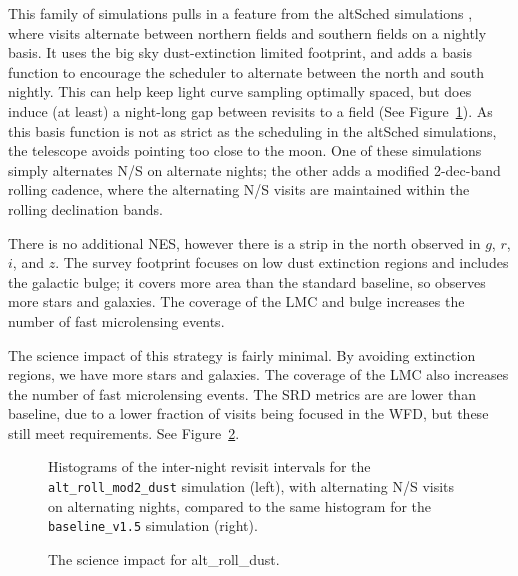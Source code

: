 This family of simulations pulls in a feature from the altSched simulations \citep{Rothchild19}, where visits alternate between northern fields and southern fields on a nightly basis. It uses the big sky dust-extinction limited footprint, and adds a basis function to encourage the scheduler to alternate between the north and south nightly. This can help keep light curve sampling optimally spaced, but does induce (at least) a night-long gap between revisits to a field (See Figure~\ref{fig:alt_internight}). As this basis function is not as strict as the scheduling in the altSched simulations, the telescope avoids pointing too close to the moon. One of these simulations simply alternates N/S on alternate nights; the other adds a modified 2-dec-band rolling cadence, where the alternating N/S visits are maintained within the rolling declination bands. 

There is no additional NES, however there is a strip in the north observed in $g$, $r$, $i$, and $z$. The survey footprint focuses on low dust extinction regions and includes the galactic bulge; it covers more area than the standard baseline, so observes more stars and galaxies. The coverage of the LMC and bulge increases the number of fast microlensing events. 

The science impact of this strategy is fairly minimal. By avoiding extinction regions, we have more stars and galaxies. The coverage of the LMC also increases the number of fast microlensing events. The SRD metrics are are lower than baseline, due to a lower fraction of visits being focused in the WFD, but these still meet requirements. See Figure~\ref{fig:alt_radar}. 

\begin{figure}
\caption{Histograms of the inter-night revisit intervals for the {\tt alt\_roll\_mod2\_dust} simulation (left), with alternating N/S visits on alternating nights, compared to the same histogram for the {\tt baseline\_v1.5} simulation (right).}
\label{fig:alt_internight}
\end{figure}

\begin{figure}
\caption{The science impact for alt\_roll\_dust.}\label{fig:alt_radar}
\end{figure}

